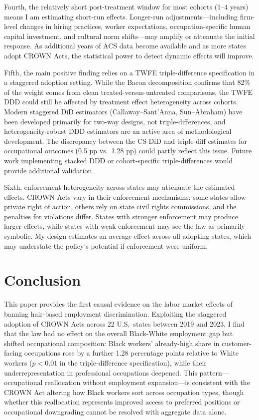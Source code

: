 \documentclass[12pt]{article}
\begin{document}
Fourth, the relatively short post-treatment window for most cohorts (1--4 years) means I am estimating short-run effects. Longer-run adjustments---including firm-level changes in hiring practices, worker expectations, occupation-specific human capital investment, and cultural norm shifts---may amplify or attenuate the initial response. As additional years of ACS data become available and as more states adopt CROWN Acts, the statistical power to detect dynamic effects will improve.

Fifth, the main positive finding relies on a TWFE triple-difference specification in a staggered adoption setting. While the Bacon decomposition confirms that 82\% of the weight comes from clean treated-versus-untreated comparisons, the TWFE DDD could still be affected by treatment effect heterogeneity across cohorts. Modern staggered DiD estimators (Callaway--Sant'Anna, Sun--Abraham) have been developed primarily for two-way designs, not triple-differences, and heterogeneity-robust DDD estimators are an active area of methodological development. The discrepancy between the CS-DiD and triple-diff estimates for occupational outcomes (0.5 pp vs.\ 1.28 pp) could partly reflect this issue. Future work implementing stacked DDD or cohort-specific triple-differences would provide additional validation.

Sixth, enforcement heterogeneity across states may attenuate the estimated effects. CROWN Acts vary in their enforcement mechanisms: some states allow private right of action, others rely on state civil rights commissions, and the penalties for violations differ. States with stronger enforcement may produce larger effects, while states with weak enforcement may see the law as primarily symbolic. My design estimates an average effect across all adopting states, which may understate the policy's potential if enforcement were uniform.

\section{Conclusion}\label{sec:conclusion}

This paper provides the first causal evidence on the labor market effects of banning hair-based employment discrimination. Exploiting the staggered adoption of CROWN Acts across 22 U.S.\ states between 2019 and 2023, I find that the law had no effect on the overall Black-White employment gap but shifted occupational composition: Black workers' already-high share in customer-facing occupations rose by a further 1.28 percentage points relative to White workers ($p < 0.01$ in the triple-difference specification), while their underrepresentation in professional occupations deepened. This pattern---occupational reallocation without employment expansion---is consistent with the CROWN Act altering how Black workers sort across occupation types, though whether this reallocation represents improved access to preferred positions or occupational downgrading cannot be resolved with aggregate data alone.
\end{document}
